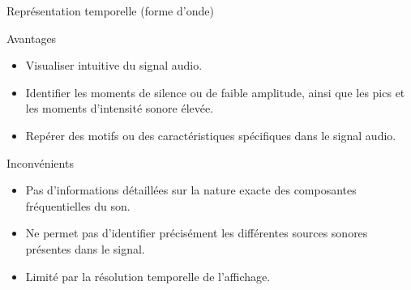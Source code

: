 \documentclass[compress,xcolor=table]{beamer}
\begin{document}
\begin{frame}{Représentation temporelle (forme d'onde)}

    \begin{block}{Avantages}
        \begin{itemize}
            \item Visualiser intuitive du signal audio. %
            \item Identifier les moments de silence ou de faible amplitude, ainsi que les pics et les moments d'intensité sonore élevée.
            \item Repérer des motifs ou des caractéristiques spécifiques dans le signal audio.
        \end{itemize}
    \end{block}

    \begin{alertblock}{Inconvénients}
        \begin{itemize}
            \item Pas d'informations détaillées sur la nature exacte des composantes fréquentielles du son.
            \item Ne permet pas d'identifier précisément les différentes sources sonores présentes dans le signal.
            \item Limité par la résolution temporelle de l'affichage. %
        \end{itemize}
    \end{alertblock}

\end{frame}
\end{document}

